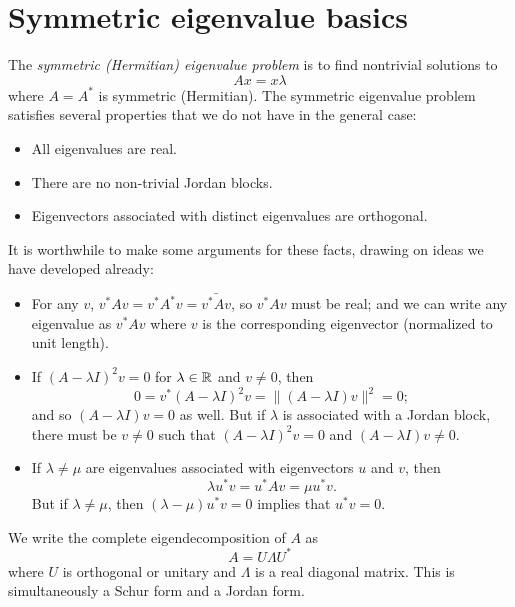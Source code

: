 \documentclass[12pt, leqno]{article} %
\begin{document}

\section{Symmetric eigenvalue basics}


The {\em symmetric (Hermitian) eigenvalue problem} is to find nontrivial
solutions to
\[
  A x = x \lambda
\]
where $A = A^*$ is symmetric (Hermitian).  The symmetric eigenvalue
problem satisfies several properties that we do not have in the general
case:
\begin{itemize}
\item
  All eigenvalues are real.
\item
  There are no non-trivial Jordan blocks.
\item
  Eigenvectors associated with distinct eigenvalues are orthogonal.
\end{itemize}
It is worthwhile to make some arguments for these facts, drawing
on ideas we have developed already:
\begin{itemize}
\item
  For any $v$, $v^* A v = v^* A^* v = \bar{v^* A v}$, so $v^* A v$
  must be real; and we can write any eigenvalue as $v^* A v$ where $v$
  is the corresponding eigenvector (normalized to unit length).
\item
  If $(A-\lambda I)^2 v = 0$ for $\lambda \in \mathbb{R}$ and $v \neq 0$, then
  \[
    0 = v^* (A-\lambda I)^2 v = \|(A-\lambda I) v\|^2 = 0;
  \]
  and so $(A-\lambda I) v = 0$ as well.
  But if $\lambda$ is associated with a Jordan block, there must
  be $v \neq 0$ such that $(A-\lambda I)^2 v = 0$ and
  $(A-\lambda I) v \neq 0$.
\item
  If $\lambda \neq \mu$ are eigenvalues associated with eigenvectors
  $u$ and $v$, then
  \[
    \lambda u^* v = u^* A v = \mu u^* v.
  \]
  But if $\lambda \neq \mu$, then $(\lambda-\mu) u^* v = 0$ implies
  that $u^* v = 0$.
\end{itemize}

We write the complete eigendecomposition of $A$ as
\[
  A = U \Lambda U^*
\]
where $U$ is orthogonal or unitary and $\Lambda$ is a real diagonal
matrix.  This is simultaneously a Schur form and a Jordan form.
\end{document}
